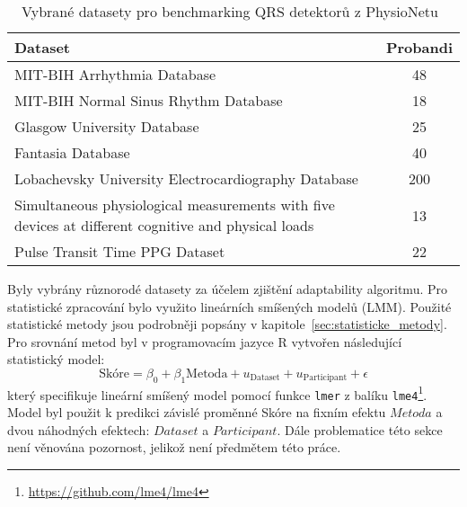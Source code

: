 \begin{table}[h]
    \begin{center}
        \caption{\label{tab:bench_datasets} Vybrané datasety pro benchmarking
            QRS detektorů z PhysioNetu~\cite{PhysioNet}}
        \renewcommand{\arraystretch}{1.3}
        \begin{tabular}{p{12cm}c}
            \toprule
            \textbf{Dataset}                                                                                                 & \textbf{Probandi} \\ \midrule
            MIT-BIH Arrhythmia Database~\cite{MITBIHArrhythmia}                                                              & 48                \\
            MIT-BIH Normal Sinus Rhythm Database~\cite{Beth1990}                                                             & 18                \\
            Glasgow University Database~\cite{GUDB}                                                                          & 25                \\
            Fantasia Database~\cite{FANTASIA}                                                                                & 40                \\
            Lobachevsky University Electrocardiography Database~\cite{LUDB}                                                  & 200               \\
            Simultaneous physiological measurements with five devices at different cognitive and physical loads~\cite{IFADO} & 13                \\
            Pulse Transit Time PPG Dataset~\cite{USYD}                                                                       & 22                \\
            \bottomrule
        \end{tabular}
    \end{center}
\end{table}

Byly vybrány různorodé datasety za účelem zjištění adaptability algoritmu. Pro
statistické zpracování bylo využito lineárních smíšených modelů (\gls{LMM}).
Použité statistické metody jsou podrobněji popsány v
kapitole~\ref{sec:statisticke_metody}. Pro srovnání metod byl v programovacím
jazyce R vytvořen následující statistický model:
\begin{equation}
    \text{Skóre} = \beta_0 + \beta_1\text{Metoda} + u_{\text{Dataset}} + u_{\text{Participant}} + \epsilon
\end{equation}
který specifikuje lineární smíšený model pomocí funkce \texttt{lmer} z balíku
\texttt{lme4}\footnote{\url{https://github.com/lme4/lme4}}. Model byl použit k
predikci závislé proměnné Skóre na fixním efektu $Metoda$ a dvou náhodných
efektech: $Dataset$ a $Participant$. Dále problematice této sekce není věnována
pozornost, jelikož není předmětem této práce. 

